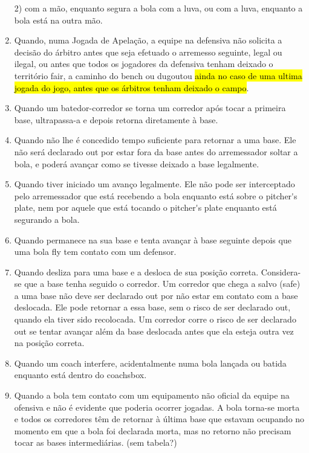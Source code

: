 \begin{enumerate}[label=(\alph*)]
	2) com a mão, enquanto segura a bola com a luva, ou com a luva, enquanto a bola está na outra mão.

	\item  Quando, numa Jogada de Apelação, a equipe na defensiva não solicita a decisão do árbitro antes que seja efetuado o arremesso seguinte, legal ou ilegal, ou antes que todos os jogadores da defensiva tenham deixado o território \gls{fair}, a caminho do \gls{bench} ou \gls{dugout}ou \hl{ainda no caso de uma ultima jogada do jogo, antes que os \'arbitros tenham deixado o campo}.
	\item   Quando um batedor-corredor se torna um corredor após tocar a primeira base, ultrapassa-a e depois retorna diretamente à base.
	\item   Quando não lhe é concedido tempo suficiente para retornar a uma base. Ele não será declarado \gls{out} por estar fora da base antes do arremessador soltar a bola, e poderá avançar como se tivesse deixado a base legalmente.

	\item Quando tiver iniciado um avanço legalmente. Ele não pode ser interceptado pelo arremessador que está recebendo a bola enquanto está sobre o \gls{pitcher's plate}, nem por aquele que está tocando o \gls{pitcher's plate} enquanto está segurando a bola.
	\item  Quando permanece na sua base e tenta avançar à base seguinte depois que uma bola \gls{fly} tem contato com um defensor.
	\item  Quando desliza para uma base e a desloca de sua posição correta. Considera-se que a base tenha seguido o corredor. Um corredor que chega a salvo (\gls{safe}) a uma base não deve ser declarado \gls{out} por não estar em contato com a base deslocada. Ele pode retornar a essa base, sem o risco de ser declarado \gls{out}, quando ela tiver sido recolocada. Um corredor corre o risco de ser declarado \gls{out} se tentar avançar além da base deslocada antes que ela esteja outra vez na posição correta.
	\item  Quando um \gls{coach} interfere, acidentalmente numa bola lançada ou batida enquanto está dentro do \gls{coachsbox}.
	\item  Quando a bola tem contato com um equipamento não oficial da equipe na ofensiva e não é evidente que poderia ocorrer jogadas. A bola torna-se morta e todos os corredores têm de retornar à última base que estavam ocupando no momento em que a bola foi declarada morta, mas no retorno não precisam tocar as bases intermediárias. (sem tabela?)
\end{enumerate}

